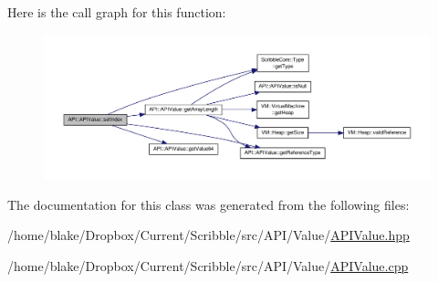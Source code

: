 Here is the call graph for this function\-:
\nopagebreak
\begin{figure}[H]
\begin{center}
\leavevmode
\includegraphics[width=350pt]{class_a_p_i_1_1_a_p_i_value_aa8a379bf602fc10523bfc4a4867dbc55_cgraph}
\end{center}
\end{figure}




The documentation for this class was generated from the following files\-:\begin{DoxyCompactItemize}
\item 
/home/blake/\-Dropbox/\-Current/\-Scribble/src/\-A\-P\-I/\-Value/\hyperlink{_a_p_i_value_8hpp}{A\-P\-I\-Value.\-hpp}\item 
/home/blake/\-Dropbox/\-Current/\-Scribble/src/\-A\-P\-I/\-Value/\hyperlink{_a_p_i_value_8cpp}{A\-P\-I\-Value.\-cpp}\end{DoxyCompactItemize}
